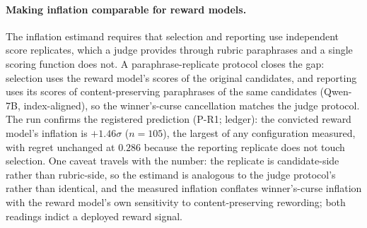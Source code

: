 \paragraph{Making inflation comparable for reward models.}
The inflation estimand requires that selection and reporting use independent score replicates, which a judge provides through rubric paraphrases and a single scoring function does not.
A paraphrase-replicate protocol closes the gap: selection uses the reward model's scores of the original candidates, and reporting uses its scores of content-preserving paraphrases of the same candidates (Qwen-7B, index-aligned), so the winner's-curse cancellation matches the judge protocol.
The run confirms the registered prediction (P-R1; ledger): the convicted reward model's inflation is $+1.46\sigma$ ($n{=}105$), the largest of any configuration measured, with regret unchanged at $0.286$ because the reporting replicate does not touch selection.
One caveat travels with the number: the replicate is candidate-side rather than rubric-side, so the estimand is analogous to the judge protocol's rather than identical, and the measured inflation conflates winner's-curse inflation with the reward model's own sensitivity to content-preserving rewording; both readings indict a deployed reward signal.
